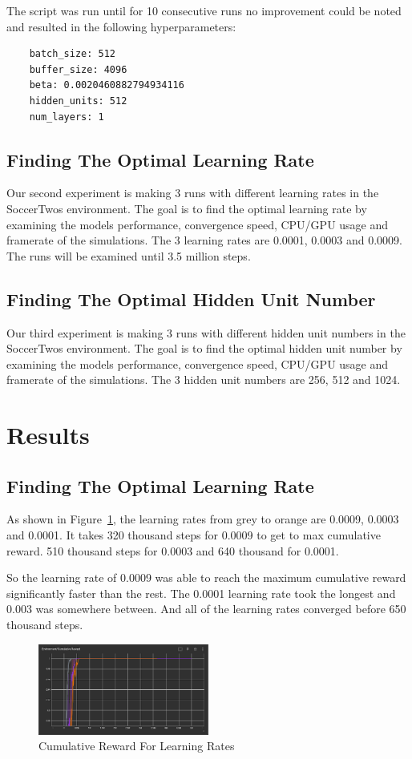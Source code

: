 \documentclass{LSkill}
\begin{document}
The script was run until for 10 consecutive runs no improvement could be noted and resulted in the following hyperparameters:


\begin{verbatim}
    batch_size: 512
    buffer_size: 4096
    beta: 0.0020460882794934116
    hidden_units: 512
    num_layers: 1
\end{verbatim}

\subsection{Finding The Optimal Learning Rate}
Our second experiment is making 3 runs with different learning rates in the SoccerTwos environment. The goal is to find the optimal learning rate by examining the models performance, convergence speed, CPU/GPU usage and framerate of the simulations. The 3 learning rates are 0.0001, 0.0003 and 0.0009. The runs will be examined until 3.5 million steps.

\subsection{Finding The Optimal Hidden Unit Number}
Our third experiment is making 3 runs with different hidden unit numbers in the SoccerTwos environment. The goal is to find the optimal hidden unit number by examining the models performance, convergence speed, CPU/GPU usage and framerate of the simulations. The 3 hidden unit numbers are 256, 512 and 1024.
 
\section{Results}
\subsection{Finding The Optimal Learning Rate}
As shown in Figure~\ref{fig:Cumulative Reward For Learning Rates}, the learning rates from grey to orange are 0.0009, 0.0003 and 0.0001. It takes 320 thousand steps for 0.0009 to get to max cumulative reward. 510 thousand steps for 0.0003 and 640 thousand for 0.0001.

So the learning rate of 0.0009 was able to reach the maximum cumulative reward significantly faster than the rest. The 0.0001 learning rate took the longest and 0.003 was somewhere between. And all of the learning rates converged before 650 thousand steps.


\begin{figure}[htbp]
    \centering
    \includegraphics[width=0.5\textwidth]{figure 2.png} 
    \caption{Cumulative Reward For Learning Rates}
    \label{fig:Cumulative Reward For Learning Rates}
\end{figure}
\end{document}
